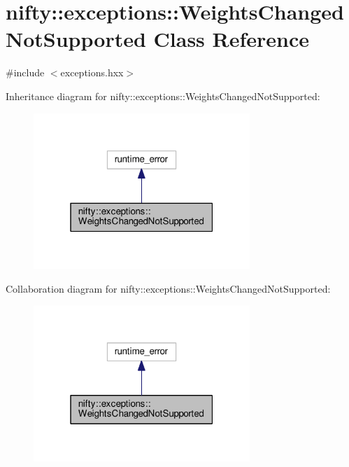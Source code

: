 \hypertarget{classnifty_1_1exceptions_1_1WeightsChangedNotSupported}{}\section{nifty\+:\+:exceptions\+:\+:Weights\+Changed\+Not\+Supported Class Reference}
\label{classnifty_1_1exceptions_1_1WeightsChangedNotSupported}


{\ttfamily \#include $<$exceptions.\+hxx$>$}



Inheritance diagram for nifty\+:\+:exceptions\+:\+:Weights\+Changed\+Not\+Supported\+:\nopagebreak
\begin{figure}[H]
\begin{center}
\leavevmode
\includegraphics[width=232pt]{classnifty_1_1exceptions_1_1WeightsChangedNotSupported__inherit__graph}
\end{center}
\end{figure}


Collaboration diagram for nifty\+:\+:exceptions\+:\+:Weights\+Changed\+Not\+Supported\+:\nopagebreak
\begin{figure}[H]
\begin{center}
\leavevmode
\includegraphics[width=232pt]{classnifty_1_1exceptions_1_1WeightsChangedNotSupported__coll__graph}
\end{center}
\end{figure}
